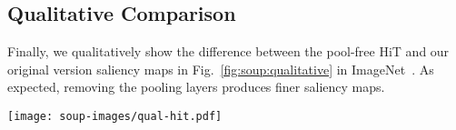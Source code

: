 \subsection{Qualitative Comparison} \label{sec:soup:qual}

Finally, we qualitatively show the difference between the pool-free HiT and our original version saliency maps in Fig.~\ref{fig:soup:qualitative} in ImageNet~\cite{deng2009imagenet}. As expected, removing the pooling layers produces finer saliency maps.

\begin{figure*}[h]
    \centering
    \texttt{[image: soup-images/qual-hit.pdf]}
    \caption{\textbf{Qualitative Examples:} we visually show the difference between HiT saliency maps with and without pooling layers on some correctly classified images from the ImageNet dataset.}
    \label{fig:soup:qualitative}
\end{figure*}
